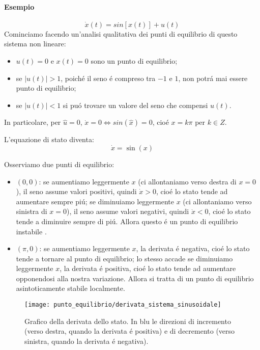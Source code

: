 \documentclass[../main.tex]{subfiles}
\begin{document}
		\begin{mdframed}[style=Esempio]
			\paragraph{Esempio}
			\[
				\dot x(t) = sin\left[ x(t) \right] + u(t)
			\]
			Cominciamo facendo un'analisi qualitativa dei punti di equilibrio di questo sistema non lineare:
			\begin{itemize}
				\item
					$ u(t) = 0 $ e $ x(t) = 0 $ sono un punto di equilibrio;
				\item
					se $ |u(t)|>1 $, poich\'e il seno \'e compreso tra $ -1 $ e $ 1 $, non potr\'a mai essere punto di equilibrio;
				\item
					se $ |u(t)|<1 $ si pu\'o trovare un valore del seno che compensi $ u(t) $. 
			\end{itemize}
			
			\noindent
			In particolare, per $ \hat u = 0 $, $ \dot x = 0 \Leftrightarrow sin(\hat x) = 0 $, cio\'e $ x = k\pi $ per $ k \in Z $.
			
			L'equazione di stato diventa:
			\[
				\dot x = \sin(x)
			\]
			
			Osserviamo due punti di equilibrio:
			\begin{itemize}
				\item
					$ (0,0) $: se aumentiamo leggermente $ x $ (ci allontaniamo verso destra di $ x = 0 $), il seno assume valori positivi, quindi $ \dot x > 0 $, cio\'e lo stato tende ad aumentare sempre pi\'u; se diminuiamo leggermente $ x $ (ci allontaniamo verso sinistra di $ x = 0 $), il seno assume valori negativi, quindi $ \dot x < 0 $, cio\'e lo stato tende a diminuire sempre di pi\'u. Allora questo \'e un punto di equilibrio instabile .
				\item
					$ (\pi, 0) $: se aumentiamo leggermente $ x $, la derivata \'e negativa, cio\'e lo stato tende a tornare al punto di equilibrio; lo stesso accade se diminuiamo leggermente $ x $, la derivata \'e positiva, cio\'e lo stato tende ad aumentare opponendosi alla nostra variazione. Allora si tratta di un punto di equilibrio asintoticamente stabile localmente. 
			\end{itemize}
		
			\begin{figure}[H]
				\centering
				\texttt{[image: punto\_equilibrio/derivata\_sistema\_sinusoidale]}
				\caption{Grafico della derivata dello stato. In blu le direzioni di incremento (verso destra, quando la derivata \'e positiva) e di decremento (verso sinistra, quando la derivata \'e negativa).}
			\end{figure}
		

\end{mdframed}
\end{document}
